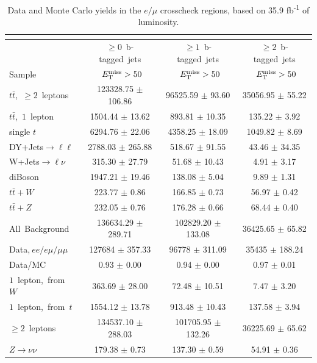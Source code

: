 \begin{table}[htb]
\centering
\caption{Data and Monte Carlo yields in the $e/\mu$ crosscheck
  regions, based on 35.9 fb\textsuperscript{-1} of luminosity.}
\label{tab:emu:yields}
\begin{tabular}{|l|c|c|c|}

\multicolumn{4}{c}{}\\* \hline
  & $\ge0$~b-tagged~jets & $\ge1$~b-tagged~jets  & $\ge2$~b-tagged~jets \\*
Sample  & ~$E_\text{T}^\text{miss}>50$ & ~$E_\text{T}^\text{miss}>50$  & ~$E_\text{T}^\text{miss}>50$ \\*
\hline \hline

$t\bar{t}$,~$\ge2$~leptons & 123328.75 $\pm$ 106.86  & 96525.59 $\pm$ 93.60  & 35056.95 $\pm$ 55.22 \\*
$t\bar{t}$,~$1$~lepton & 1504.44 $\pm$ 13.62  & 893.81 $\pm$ 10.35  & 135.22 $\pm$ 3.92 \\*
single $t$  & 6294.76 $\pm$ 22.06  & 4358.25 $\pm$ 18.09  & 1049.82 $\pm$ 8.69 \\*
DY+Jets$\rightarrow\ell\ell$  & 2788.03 $\pm$ 265.88  & 518.67 $\pm$ 91.55  & 43.46 $\pm$ 34.35 \\*
W+Jets$\rightarrow\ell\nu$  & 315.30 $\pm$ 27.79  & 51.68 $\pm$ 10.43  & 4.91 $\pm$ 3.17 \\*
diBoson  & 1947.21 $\pm$ 19.46  & 138.08 $\pm$ 5.04  & 9.89 $\pm$ 1.31 \\*
$t\bar{t}+W$  & 223.77 $\pm$ 0.86  & 166.85 $\pm$ 0.73  & 56.97 $\pm$ 0.42 \\*
$t\bar{t}+Z$  & 232.05 $\pm$ 0.76  & 176.28 $\pm$ 0.66  & 68.44 $\pm$ 0.40 \\*
\hline \hline
All~Background  & 136634.29 $\pm$ 289.71  & 102829.20 $\pm$ 133.08  & 36425.65 $\pm$ 65.82 \\*
Data,$~ee/e\mu/\mu\mu$  & 127684 $\pm$ 357.33  & 96778 $\pm$ 311.09  & 35435 $\pm$ 188.24 \\*
Data/MC  & 0.93 $\pm$ 0.00  & 0.94 $\pm$ 0.00  & 0.97 $\pm$ 0.01 \\*
\hline \hline
$1$~lepton,~from~$W$  & 363.69 $\pm$ 28.00  & 72.48 $\pm$ 10.51  & 7.47 $\pm$ 3.20 \\*
$1$~lepton,~from~$t$  & 1554.12 $\pm$ 13.78  & 913.48 $\pm$ 10.43  & 137.58 $\pm$ 3.94 \\*
$\ge2$~leptons  & 134537.10 $\pm$ 288.03  & 101705.95 $\pm$ 132.26  & 36225.69 $\pm$ 65.62 \\*
$Z\rightarrow\nu\nu$  & 179.38 $\pm$ 0.73  & 137.30 $\pm$ 0.59  & 54.91 $\pm$ 0.36 \\*
\hline
\end{tabular}
\end{table}

